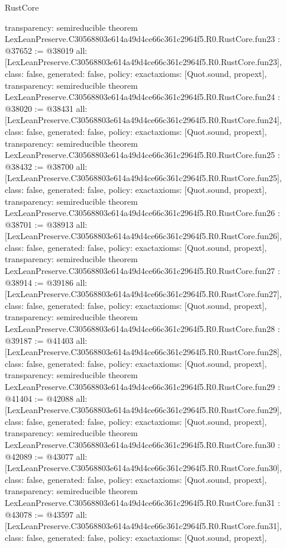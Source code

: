 \begin{lexlean}{RustCore}
\begin{coremodule}
{  transparency: semireducible
}
theorem LexLeanPreserve.C30568803e614a49d4ce66c361c2964f5.R0.RustCore.fun23 : @37652 := @38019 {
  all: [LexLeanPreserve.C30568803e614a49d4ce66c361c2964f5.R0.RustCore.fun23],
  class: false,
  generated: false,
  policy: exact{axioms: [Quot.sound, propext]},
  transparency: semireducible
}
theorem LexLeanPreserve.C30568803e614a49d4ce66c361c2964f5.R0.RustCore.fun24 : @38020 := @38431 {
  all: [LexLeanPreserve.C30568803e614a49d4ce66c361c2964f5.R0.RustCore.fun24],
  class: false,
  generated: false,
  policy: exact{axioms: [Quot.sound, propext]},
  transparency: semireducible
}
theorem LexLeanPreserve.C30568803e614a49d4ce66c361c2964f5.R0.RustCore.fun25 : @38432 := @38700 {
  all: [LexLeanPreserve.C30568803e614a49d4ce66c361c2964f5.R0.RustCore.fun25],
  class: false,
  generated: false,
  policy: exact{axioms: [Quot.sound, propext]},
  transparency: semireducible
}
theorem LexLeanPreserve.C30568803e614a49d4ce66c361c2964f5.R0.RustCore.fun26 : @38701 := @38913 {
  all: [LexLeanPreserve.C30568803e614a49d4ce66c361c2964f5.R0.RustCore.fun26],
  class: false,
  generated: false,
  policy: exact{axioms: [Quot.sound, propext]},
  transparency: semireducible
}
theorem LexLeanPreserve.C30568803e614a49d4ce66c361c2964f5.R0.RustCore.fun27 : @38914 := @39186 {
  all: [LexLeanPreserve.C30568803e614a49d4ce66c361c2964f5.R0.RustCore.fun27],
  class: false,
  generated: false,
  policy: exact{axioms: [Quot.sound, propext]},
  transparency: semireducible
}
theorem LexLeanPreserve.C30568803e614a49d4ce66c361c2964f5.R0.RustCore.fun28 : @39187 := @41403 {
  all: [LexLeanPreserve.C30568803e614a49d4ce66c361c2964f5.R0.RustCore.fun28],
  class: false,
  generated: false,
  policy: exact{axioms: [Quot.sound, propext]},
  transparency: semireducible
}
theorem LexLeanPreserve.C30568803e614a49d4ce66c361c2964f5.R0.RustCore.fun29 : @41404 := @42088 {
  all: [LexLeanPreserve.C30568803e614a49d4ce66c361c2964f5.R0.RustCore.fun29],
  class: false,
  generated: false,
  policy: exact{axioms: [Quot.sound, propext]},
  transparency: semireducible
}
theorem LexLeanPreserve.C30568803e614a49d4ce66c361c2964f5.R0.RustCore.fun30 : @42089 := @43077 {
  all: [LexLeanPreserve.C30568803e614a49d4ce66c361c2964f5.R0.RustCore.fun30],
  class: false,
  generated: false,
  policy: exact{axioms: [Quot.sound, propext]},
  transparency: semireducible
}
theorem LexLeanPreserve.C30568803e614a49d4ce66c361c2964f5.R0.RustCore.fun31 : @43078 := @43597 {
  all: [LexLeanPreserve.C30568803e614a49d4ce66c361c2964f5.R0.RustCore.fun31],
  class: false,
  generated: false,
  policy: exact{axioms: [Quot.sound, propext]},
}
\end{coremodule}
\end{lexlean}
